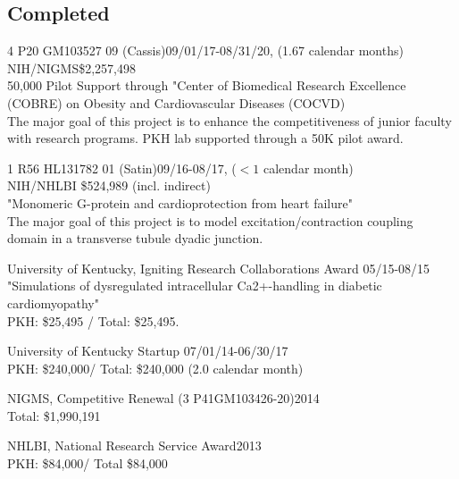 
\subsection{Completed} 
\vspace{-10pt}

4 P20 GM103527	09 (Cassis)\dacoi \hfill 09/01/17-08/31/20,  (1.67 calendar months) \\
NIH/NIGMS\hfill \$2,257,498\\
50,000 Pilot Support through "Center of Biomedical Research Excellence (COBRE) on Obesity and Cardiovascular Diseases (COCVD)\\
The major goal of this project is to enhance the competitiveness of junior faculty with research programs. 
PKH lab supported through a 50K pilot award. %


1	R56	HL131782	01 (Satin)\dacoi\hfill 09/16-08/17, ($<1$ calendar month)\\
NIH/NHLBI \hfill \$524,989 (incl. indirect)\\
"Monomeric G-protein and cardioprotection from heart failure"\\
The major goal of this project is to model excitation/contraction coupling domain in a transverse tubule dyadic junction. 

University of Kentucky, Igniting Research Collaborations Award \dapi \hfill 05/15-08/15 \\
"Simulations of dysregulated intracellular Ca2+-handling in diabetic cardiomyopathy"  \\
PKH: \$25,495 / Total: \$25,495.

University of Kentucky Startup \dapi \hfill 07/01/14-06/30/17 \\
PKH: \$240,000/ Total: \$240,000 (2.0 calendar month)


NIGMS, Competitive Renewal (3 P41GM103426-20)\dasig\hfill 2014 \\
Total: \$1,990,191 

NHLBI, National Research Service Award\dapi  \hfill 2013 \\  %
PKH: \$84,000/ Total \$84,000

